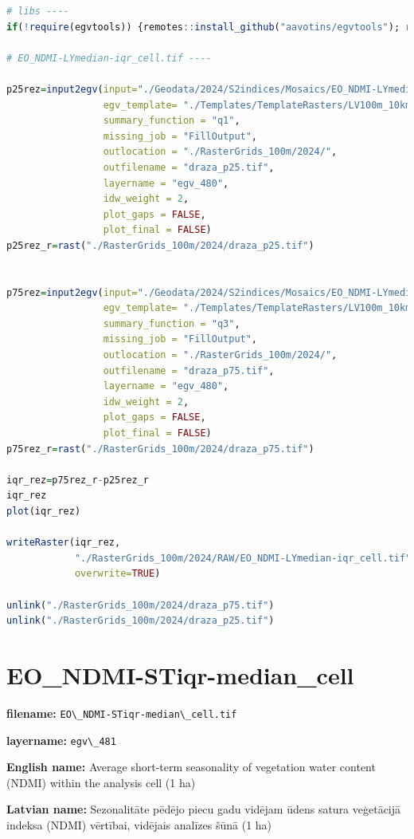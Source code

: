 \documentclass[
]{book}
\newcommand{\passthrough}[1]{#1}
\begin{document}
\begin{lstlisting}[language=R]
# libs ----
if(!require(egvtools)) {remotes::install_github("aavotins/egvtools"); require(egvtools)}

# EO_NDMI-LYmedian-iqr_cell.tif ----

p25rez=input2egv(input="./Geodata/2024/S2indices/Mosaics/EO_NDMI-LYmedian.tif",
                 egv_template= "./Templates/TemplateRasters/LV100m_10km.tif",
                 summary_function = "q1",
                 missing_job = "FillOutput",
                 outlocation = "./RasterGrids_100m/2024/",
                 outfilename = "draza_p25.tif",
                 layername = "egv_480",
                 idw_weight = 2,
                 plot_gaps = FALSE,
                 plot_final = FALSE)
p25rez_r=rast("./RasterGrids_100m/2024/draza_p25.tif")


p75rez=input2egv(input="./Geodata/2024/S2indices/Mosaics/EO_NDMI-LYmedian.tif",
                 egv_template= "./Templates/TemplateRasters/LV100m_10km.tif",
                 summary_function = "q3",
                 missing_job = "FillOutput",
                 outlocation = "./RasterGrids_100m/2024/",
                 outfilename = "draza_p75.tif",
                 layername = "egv_480",
                 idw_weight = 2,
                 plot_gaps = FALSE,
                 plot_final = FALSE)
p75rez_r=rast("./RasterGrids_100m/2024/draza_p75.tif")

iqr_rez=p75rez_r-p25rez_r
iqr_rez
plot(iqr_rez)

writeRaster(iqr_rez,
            "./RasterGrids_100m/2024/RAW/EO_NDMI-LYmedian-iqr_cell.tif",
            overwrite=TRUE)

unlink("./RasterGrids_100m/2024/draza_p75.tif")
unlink("./RasterGrids_100m/2024/draza_p25.tif")
\end{lstlisting}

\section{EO\_NDMI-STiqr-median\_cell}\label{ch06.481}

\textbf{filename:} \passthrough{\lstinline!EO\_NDMI-STiqr-median\_cell.tif!}

\textbf{layername:} \passthrough{\lstinline!egv\_481!}

\textbf{English name:} Average short-term seasonality of vegetation water content (NDMI) within the analysis cell (1 ha)

\textbf{Latvian name:} Sezonalitāte pēdējo piecu gadu vidējam ūdens satura veģetācijā indeksa (NDMI) vērtībai, vidējais analīzes šūnā (1 ha)
\end{document}
